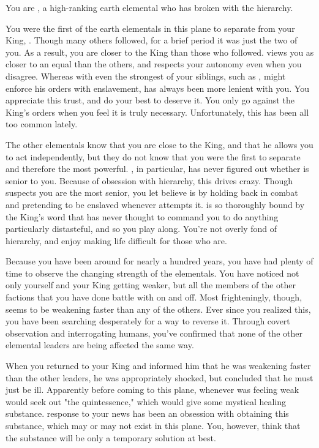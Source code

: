 \documentclass[char]{elementals}
\begin{document}
\name{\cRogue{}}

You are \cRogue{\intro}, a high-ranking earth elemental who has broken with the hierarchy.

You were the first of the earth elementals in this plane to separate from your King, \cEarthKing{}.  Though many others followed, for a brief period it was just the two of you.  As a result, you are closer to the King than those who followed.  \cEarthKing{\They} views you as closer to an equal than the others, and respects your autonomy even when you disagree.  Whereas with even the strongest of your siblings, such as \cLoyal{\intro}, \cEarthKing{} might enforce his orders with enslavement, \cEarthKing{\they} has always been more lenient with you.  You appreciate this trust, and do your best to deserve it.  You only go against the King's orders when you feel it is truly necessary.  Unfortunately, this has been all too common lately.

The other elementals know that you are close to the King, and that he allows you to act independently, but they do not know that you were the first to separate and therefore the most powerful.  \cLoyal{}, in particular, has never figured out whether \cLoyal{\they} is senior to you.  Because of \cLoyal{\their} obsession with hierarchy, this drives \cLoyal{\them} crazy.  Though \cLoyal{\they} suspects you are the most senior, you let \cLoyal{\them} believe \cLoyal{\they} is by holding back in combat and pretending to be enslaved whenever \cLoyal{\they} attempts it.  \cLoyal{} is so thoroughly bound by the King's word that \cLoyal{\they} has never thought to command you to do anything particularly distasteful, and so you play along.  You're not overly fond of hierarchy, and enjoy making life difficult for those who are.

Because you have been around for nearly a hundred years, you have had plenty of time to observe the changing strength of the elementals.  You have noticed not only yourself and your King getting weaker, but all the members of the other factions that you have done battle with on and off.  Most frighteningly, though, \cEarthKing{} seems to be weakening faster than any of the others.  Ever since you realized this, you have been searching desperately for a way to reverse it.  Through covert observation and interrogating humans, you've confirmed that none of the other elemental leaders are being affected the same way.

When you returned to your King and informed him that he was weakening faster than the other leaders, he was appropriately shocked, but concluded that he must just be ill.  Apparently before coming to this plane, whenever \cEarthKing{\they} was feeling weak \cEarthKing{\they} would seek out "the quintessence," which would give \cEarthKing{\them} some mystical healing substance.  \cEarthKing{\Their} response to your news has been an obsession with obtaining this substance, which may or may not exist in this plane.  You, however, think that the substance will be only a temporary solution at best.
\end{document}
